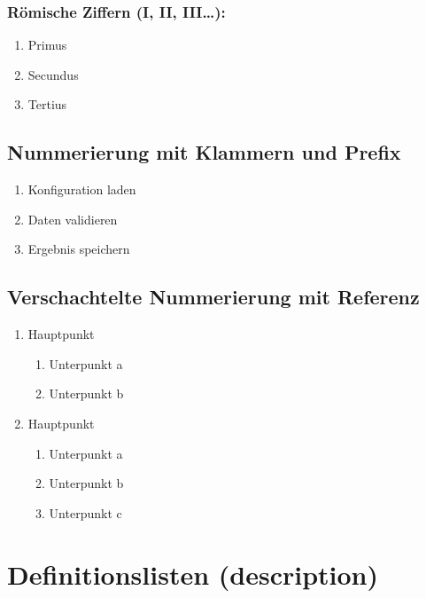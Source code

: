 \subsection{Römische Ziffern (I, II, III\ldots):}
\begin{enumerate}[label=\Roman*.]
    \item Primus
    \item Secundus
    \item Tertius
\end{enumerate}

\section{Nummerierung mit Klammern und Prefix}

\begin{enumerate}[label=\textbf{Aufgabe~\arabic*:}]
    \item Konfiguration laden
    \item Daten validieren
    \item Ergebnis speichern
\end{enumerate}

\section{Verschachtelte Nummerierung mit Referenz}

\begin{enumerate}[label=\arabic*]
    \item Hauptpunkt
    \begin{enumerate}[label=\theenumi.\alph*]
        \item Unterpunkt a
        \item Unterpunkt b
    \end{enumerate}
    \item Hauptpunkt
    \begin{enumerate}[label=\theenumi.\alph*]
        \item Unterpunkt a
        \item Unterpunkt b
        \item Unterpunkt c
    \end{enumerate}
\end{enumerate}

\chapter{Definitionslisten (description)}
\label{sec:description}

